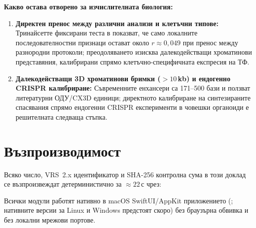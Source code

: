 \documentclass[10.5pt,a4paper]{article}
\begin{document}
\textbf{Какво остава отворено за изчислителната биология:}
\begin{enumerate}
\item \textbf{Директен пренос между различни анализи и клетъчни типове:} Тринайсетте фиксирани теста в  показват, че само локалните последователностни признаци остават около $r\approx 0{,}049$ при пренос между разнородни протоколи; преодоляването изисква далекодействащи хроматинови представяния, калибрирани спрямо клетъчно-специфичната експресия на ТФ.
\item \textbf{Далекодействащи 3D хроматинови бримки ($>10$\,kb) и ендогенно CRISPR калибриране:} Съвременните енхансери са 171--500 бази и ползват литературни ОДУ/CX3D единици; директното калибриране на синтезираните спасявания спрямо ендогенни CRISPR експерименти в човешки органоиди е решителната следваща стъпка.
\end{enumerate}

\section{Възпроизводимост}

Всяко число, VRS~2.x идентификатор и SHA-256 контролна сума в този доклад се възпроизвеждат детерминистично за $\approx 22$\,с чрез:
\begin{center}
\end{center}
Всички модули работят нативно в macOS SwiftUI/AppKit приложението (; нативните версии за Linux и Windows предстоят скоро\texttrademark) без браузърна обвивка и без локални мрежови портове.


\end{document}
